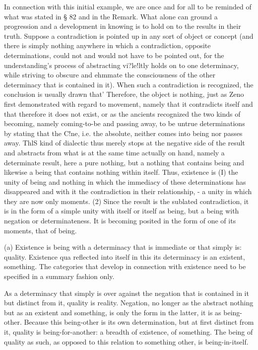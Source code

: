     In connection with this initial example, we are once and for all
    to be reminded of what was stated in § 82 and in the Remark.
    What alone can ground a progression and a development in knowing is
    to hold on to the results in their truth.
    Suppose a contradiction is pointed up in any sort of object or concept (and
    there is simply nothing anywhere in which a contradiction,
    opposite determinations, could not and would not have to be
    pointed out, for the understanding's process of abstracting vi?le!ltly
    holds on to one determinacy, while striving to obscure and ehmmate
    the consciousness of the other determinacy that is contained in it).
    When such a contradiction is recognized, the conclusion is usually
    drawn that' Therefore, the object is nothing, just as Zeno first
    demonstrated with regard to movement, namely that it contradicts
    itself and that therefore it does not exist, or as the ancients
    recognized the two kinds of becoming, namely coming-to-be and
    passing away, to be untrue determinations by stating that the C!ne,
    i.e. the absolute, neither comes into being nor passes away. ThlS
    kind of dialectic thus merely stops at the negative side of the result
    and abstracts from what is at the same time actually on hand,
    namely a determinate result, here a pure nothing, but a nothing that
    contains being and likewise a being that contains nothing within
    itself. Thus, existence is (I) the unity of being and nothing in
    which the immediacy of these determinations has disappeared and
    with it the contradiction in their relationship, - a unity in which
    they are now only moments. (2) Since the result is the sublated
    contradiction, it is in the form of a simple unity with itself or itself as
    being, but a being with negation or determinateness. It is becoming
    posited in the form of one of its moments, that of being.

(a) Existence is being with a determinacy
that is immediate or that simply is: quality.
Existence qua reflected into itself in this
its determinacy is an existent, something.
The categories that develop in connection with existence
need to be specified in a summary fashion only.

As a determinacy that simply is over against the negation
that is contained in it but distinct from it,
quality is reality.
Negation, no longer as the abstract nothing
but as an existent and something, is
only the form in the latter, it is as being-other.
Because this being-other is its own determination,
but at first distinct from it,
quality is being-for-another: a breadth of existence, of something.
The being of quality as such,
as opposed to this relation to something other,
is being-in-itself.

